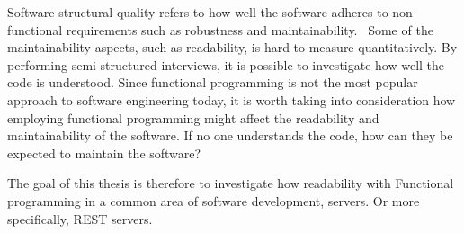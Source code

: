 Software structural quality refers to how well the software adheres to
non-functional requirements such as robustness and
maintainability.~\cite{Pressman:2004:SEP:994110} Some of the maintainability
aspects, such as readability, is hard to measure quantitatively. By performing
semi-structured interviews, it is possible to investigate how well the code is
understood. Since functional programming is not the most popular approach to
software engineering today, it is worth taking into consideration how employing
functional programming might affect the readability and maintainability of
the software. If no one understands the code, how can they be expected to
maintain the software?

The goal of this thesis is therefore to investigate how readability with
Functional programming in a common area of software development, servers. Or
more specifically, REST servers.

